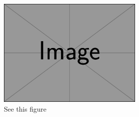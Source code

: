 \documentclass{article}
\begin{document}
\begin{figure}
  \includegraphics[width=200pt]{example-image}
  \caption{See this figure}
\end{figure}
\end{document}
